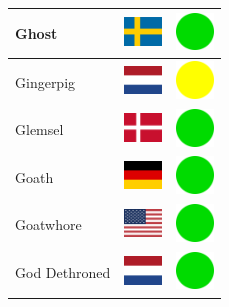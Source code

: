 \documentclass[12pt, a4paper, twoside]{report}
\begin{document}
\begin{center}
\begin{longtable}{|p{5cm}|p{2cm}|p{2cm}|}
 Ghost                                                      & \includegraphics[width=1cm]{4x3/se} &   \includegraphics[width=1cm]{likes/y} \\ \hline
 Gingerpig                                                  & \includegraphics[width=1cm]{4x3/nl} &   \includegraphics[width=1cm]{likes/m} \\ \hline
 Glemsel                                                    & \includegraphics[width=1cm]{4x3/dk} &   \includegraphics[width=1cm]{likes/y} \\ \hline
 Goath                                                      & \includegraphics[width=1cm]{4x3/de} &   \includegraphics[width=1cm]{likes/y} \\ \hline
 Goatwhore                                                  & \includegraphics[width=1cm]{4x3/us} &   \includegraphics[width=1cm]{likes/y} \\ \hline
 God Dethroned                                              & \includegraphics[width=1cm]{4x3/nl} &   \includegraphics[width=1cm]{likes/y} \\ \hline

\end{longtable}
\end{center}
\end{document}
